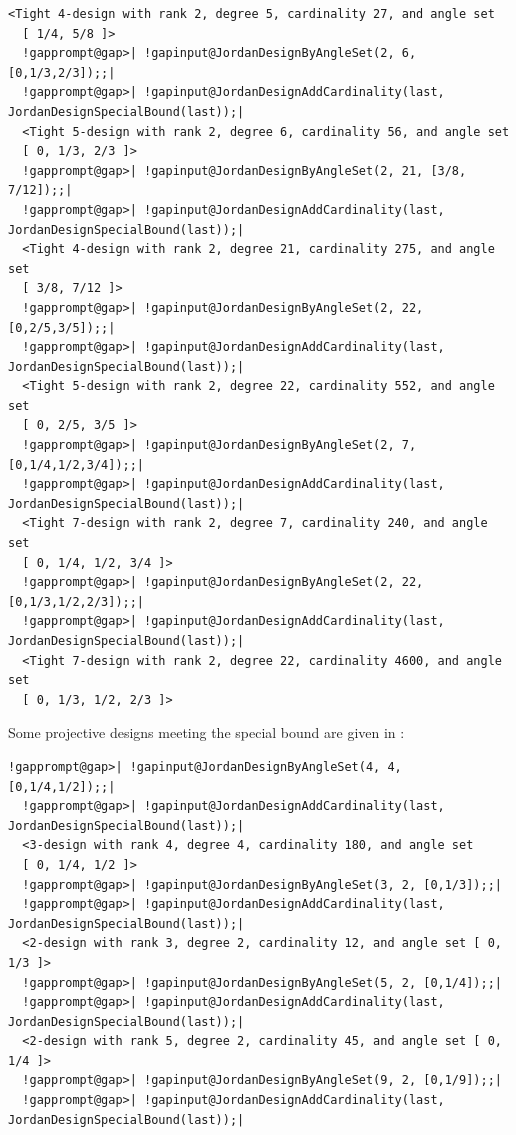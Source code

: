 \documentclass[a4paper,11pt]{report}
\begin{document}
{{\begin{Verbatim}[commandchars=!@|,fontsize=\small,frame=single,label=Example]
  <Tight 4-design with rank 2, degree 5, cardinality 27, and angle set
  [ 1/4, 5/8 ]>
  !gapprompt@gap>| !gapinput@JordanDesignByAngleSet(2, 6, [0,1/3,2/3]);;|
  !gapprompt@gap>| !gapinput@JordanDesignAddCardinality(last, JordanDesignSpecialBound(last));|
  <Tight 5-design with rank 2, degree 6, cardinality 56, and angle set
  [ 0, 1/3, 2/3 ]>
  !gapprompt@gap>| !gapinput@JordanDesignByAngleSet(2, 21, [3/8, 7/12]);;|
  !gapprompt@gap>| !gapinput@JordanDesignAddCardinality(last, JordanDesignSpecialBound(last));|
  <Tight 4-design with rank 2, degree 21, cardinality 275, and angle set
  [ 3/8, 7/12 ]>
  !gapprompt@gap>| !gapinput@JordanDesignByAngleSet(2, 22, [0,2/5,3/5]);;|
  !gapprompt@gap>| !gapinput@JordanDesignAddCardinality(last, JordanDesignSpecialBound(last));|
  <Tight 5-design with rank 2, degree 22, cardinality 552, and angle set
  [ 0, 2/5, 3/5 ]>
  !gapprompt@gap>| !gapinput@JordanDesignByAngleSet(2, 7, [0,1/4,1/2,3/4]);;|
  !gapprompt@gap>| !gapinput@JordanDesignAddCardinality(last, JordanDesignSpecialBound(last));|
  <Tight 7-design with rank 2, degree 7, cardinality 240, and angle set
  [ 0, 1/4, 1/2, 3/4 ]>
  !gapprompt@gap>| !gapinput@JordanDesignByAngleSet(2, 22, [0,1/3,1/2,2/3]);;|
  !gapprompt@gap>| !gapinput@JordanDesignAddCardinality(last, JordanDesignSpecialBound(last));|
  <Tight 7-design with rank 2, degree 22, cardinality 4600, and angle set
  [ 0, 1/3, 1/2, 2/3 ]>
\end{Verbatim}
 Some projective designs meeting the special bound are given in \cite[Examples 1\texttt{}11]{hoggar_t-designs_1982}: 
\begin{Verbatim}[commandchars=!@|,fontsize=\small,frame=single,label=Example]
  !gapprompt@gap>| !gapinput@JordanDesignByAngleSet(4, 4, [0,1/4,1/2]);;|
  !gapprompt@gap>| !gapinput@JordanDesignAddCardinality(last, JordanDesignSpecialBound(last));|
  <3-design with rank 4, degree 4, cardinality 180, and angle set
  [ 0, 1/4, 1/2 ]>
  !gapprompt@gap>| !gapinput@JordanDesignByAngleSet(3, 2, [0,1/3]);;|
  !gapprompt@gap>| !gapinput@JordanDesignAddCardinality(last, JordanDesignSpecialBound(last));|
  <2-design with rank 3, degree 2, cardinality 12, and angle set [ 0, 1/3 ]>
  !gapprompt@gap>| !gapinput@JordanDesignByAngleSet(5, 2, [0,1/4]);;|
  !gapprompt@gap>| !gapinput@JordanDesignAddCardinality(last, JordanDesignSpecialBound(last));|
  <2-design with rank 5, degree 2, cardinality 45, and angle set [ 0, 1/4 ]>
  !gapprompt@gap>| !gapinput@JordanDesignByAngleSet(9, 2, [0,1/9]);;|
  !gapprompt@gap>| !gapinput@JordanDesignAddCardinality(last, JordanDesignSpecialBound(last));|

\end{Verbatim}}}
\end{document}
